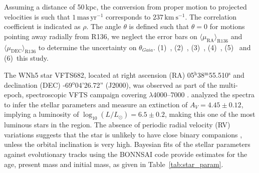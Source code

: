 \documentclass[a4paper,fleqn,usenatbib]{mnras}
\newcommand{\kms}{{\,\mathrm{km\ s^{-1}}}}
\newcommand{\masyr}{\,\mathrm{mas}\,\mathrm{yr}^{-1}}
\DeclareRobustCommand{\Tabref}[1]{Table~\ref{#1}}
\DeclareRobustCommand{\Secref}[1]{Sec.~\ref{#1}}
\begin{document}
\begin{table}
\begin{center}
\begin{tabular}{llc|c|c}
     



    \end{tabular}

    Assuming a distance of 50\,kpc, the conversion from proper motion
    to projected velocities is such that $1\masyr$ corresponds to $237\kms$.  The
      correlation coefficient is indicated as $\rho$. The angle
      $\theta$ is defined such that $\theta=0$ for motions pointing
      away radially from R136, we neglect the error bars on
      $\langle\mu_\mathrm{RA}\rangle_\mathrm{R136}$ and $\langle\mu_\mathrm{DEC}\rangle_\mathrm{R136}$ to determine the uncertainty
      on $\theta_{Gaia}$.
      (1)~\cite{brown:18},
      (2)~\cite{henault-brunet:12},
      (3)~\cite{bestenlehner:11},
      (4)~\cite{lennon:18}, 
      (5)~\cite{platais:18} and
      (6)~{\color{blue}this study}.
  \end{center}
  \label{tab:vfts682}
\end{table}


The WNh5 star VFTS682, located at right ascension (RA)
05$^\mathrm{h}$38$^\mathrm{m}$55.510$^\mathrm{s}$  and declination
(DEC) \mbox{-69$^\mathrm{o}$04'26.72''} (J2000), was observed as part of the multi-epoch, spectroscopic VFTS campaign covering $\lambda$4000--7000 \citep[][]{evans:11}. 
\citet{bestenlehner:11}  analyzed the spectra to infer the stellar
parameters and measure an extinction of $A_V=4.45\pm0.12$, implying a
luminosity of $\log_{10}(L/L_\odot) =  6.5\pm0.2$, making this one of
the most luminous stars in the region. The absence of periodic radial
velocity (RV)
variations suggests that the star is unlikely to have close binary
companions \citep[][]{bestenlehner:11}, unless the orbital inclination is
very high. Bayesian fits of the stellar
parameters against evolutionary tracks \citep{brott:11, kohler:15}
using the BONNSAI code \citep{schneider:14,schneider:17} provide
estimates for the age, present mass and initial mass, %
as given in \Tabref{tab:star_param}. %
\end{document}
